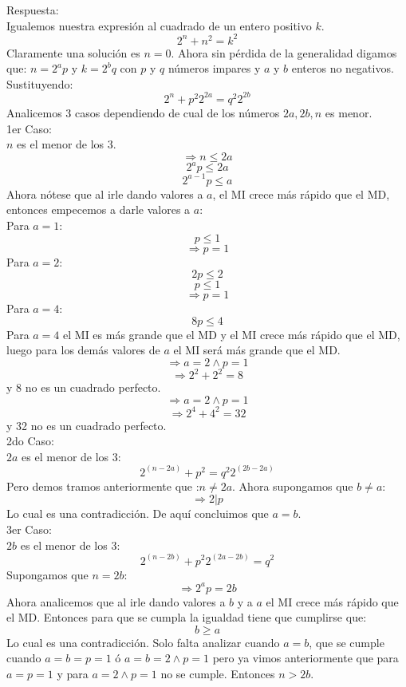 \documentclass{book}
\begin{document}
\begin{enumerate}
          Respuesta:\\
          Igualemos nuestra expresión al cuadrado de un entero positivo $k$.
          $$2^n+n^2=k^2$$
          Claramente una solución es $n=0$.
          Ahora sin pérdida de la generalidad digamos que: $n=2^a p$ y $k=2^b q$ con $p$ y $q$ números impares y $a$ y $b$ enteros no negativos.\\
          Sustituyendo:
          $$2^n+p^2 2^{2a}=q^2 2^{2b}$$
          Analicemos 3 casos dependiendo de cual de los números $2a, 2b,n$ es menor.\\
          1er Caso:\\
          $n$ es el menor de los 3.
          $$\Rightarrow n\leq 2a$$
          $$2^ap\leq 2a$$
          $$2^{a-1}p\leq a$$
          Ahora nótese que al irle dando valores a $a$, el MI crece más rápido que el MD, entonces empecemos a darle valores a $a$:\\
          Para $a=1$:
          $$p\leq 1$$
          $$\Rightarrow p=1$$
          Para $a=2$:
          $$2p\leq 2$$
          $$p\leq 1$$
          $$\Rightarrow p=1$$
          Para $a=4$:
          $$8p\leq 4$$
          Para $a=4$ el MI es más grande que el MD y el MI crece más rápido que el MD, luego para los demás valores de $a$ el MI será más grande que el MD.
          $$\Rightarrow a=2\wedge p=1$$
          $$\Rightarrow 2^2+2^2=8$$
          y 8 no es un cuadrado perfecto.\\
          $$\Rightarrow a=2\wedge p=1$$
          $$\Rightarrow 2^4+4^2=32$$
          y 32 no es un cuadrado perfecto.\\
          2do Caso:\\
          $2a$ es el menor de los 3:
          $$2^{(n-2a)}+p^2=q^2 2^{(2b-2a)}$$
          Pero demos tramos anteriormente que :$n\neq 2a$. Ahora supongamos que $b\neq a$:
          $$\Rightarrow 2|p$$
          Lo cual es una contradicción. De aquí concluimos que $a=b$.\\
          3er Caso:\\
          $2b$ es el menor de los 3:
          $$2^{(n-2b)}+p^2 2^{(2a-2b)}=q^2$$
          Supongamos que $n=2b$:
          $$\Rightarrow 2^ap=2b$$
          Ahora analicemos que al irle dando valores a $b$ y a $a$  el MI crece más rápido que el MD. Entonces para que se cumpla la igualdad tiene que cumplirse que:
          $$b\geq a$$
          Lo cual es una contradicción. Solo falta analizar cuando $a=b$, que se cumple cuando $a=b=p=1$ ó $a=b=2\wedge p=1$ pero ya vimos anteriormente que para $a=p=1$ y para $a=2\wedge p=1$ no se cumple. Entonces $n>2b$. \\

\end{enumerate}
\end{document}
